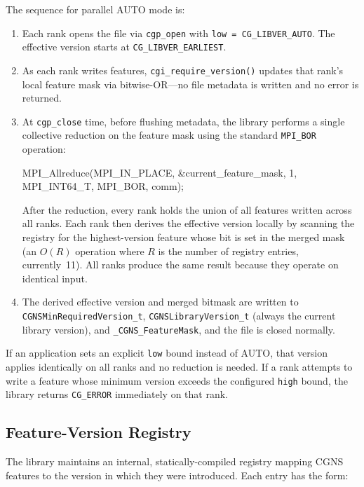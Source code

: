 \documentclass[11pt,letterpaper]{article}
\makeatletter
\let\cgns@orig@lstlisting\lstlisting
\let\cgns@endorig@lstlisting\endlstlisting
\renewenvironment{lstlisting}
  {\par\needspace{5\baselineskip}\nolinenumbers\cgns@orig@lstlisting}
  {\cgns@endorig@lstlisting\par\linenumbers}
\makeatother
\begin{document}
The sequence for parallel AUTO mode is:

\begin{enumerate}[leftmargin=2em]
\item Each rank opens the file via \texttt{cgp\_open} with
  \texttt{low~=~CG\_LIBVER\_AUTO}.  The effective version starts at
  \texttt{CG\_LIBVER\_EARLIEST}.
\item As each rank writes features, \texttt{cgi\_require\_version()}
  updates that rank's local feature mask via bitwise-OR---no file
  metadata is written and no error is returned.
\item At \texttt{cgp\_close} time, before flushing metadata, the
  library performs a single collective reduction on the feature mask
  using the standard \texttt{MPI\_BOR} operation:
\begin{lstlisting}[language=C]
MPI_Allreduce(MPI_IN_PLACE, &current_feature_mask, 1,
              MPI_INT64_T, MPI_BOR, comm);
\end{lstlisting}
  After the reduction, every rank holds the union of all features
  written across all ranks.  Each rank then derives the effective
  version locally by scanning the registry for the highest-version
  feature whose bit is set in the merged mask (an $O(R)$ operation
  where $R$ is the number of registry entries, currently~11).  All
  ranks produce the same result because they operate on identical
  input.
\item The derived effective version and merged bitmask are written to
  \texttt{CGNSMinRequiredVersion\_t},
  \texttt{CGNSLibraryVersion\_t} (always the current library version),
  and \texttt{\_CGNS\_FeatureMask}, and the file is closed normally.
\end{enumerate}

If an application sets an explicit \texttt{low} bound instead of
AUTO, that version applies identically on all ranks and no reduction
is needed.  If a rank attempts to write a feature whose minimum
version exceeds the configured \texttt{high} bound, the library
returns \texttt{CG\_ERROR} immediately on that rank.

\subsection{Feature-Version Registry}
\label{sec:feature-registry}

The library maintains an internal, statically-compiled registry
mapping CGNS features to the version in which they were introduced.
Each entry has the form:
\end{document}
